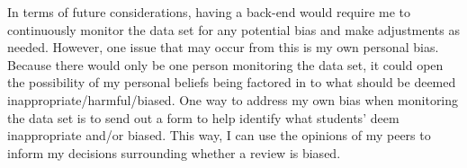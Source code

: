 \documentclass[10pt,twocolumn]{article}
\begin{document}
In terms of future considerations, having a back-end would require me to continuously monitor the data set for any potential bias and make adjustments as needed. However, one issue that may occur from this is my own personal bias. Because there would only be one person monitoring the data set, it could open the possibility of my personal beliefs being factored in to what should be deemed inappropriate/harmful/biased. One way to address my own bias when monitoring the data set is to send out a form to help identify what students' deem inappropriate and/or biased. This way, I can use the opinions of my peers to inform my decisions surrounding whether a review is biased. 



\end{document}
